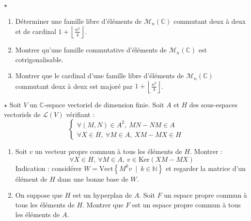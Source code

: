 \documentclass[french,a4paper]{article}
\newcommand{\N}{\mathbb{N}}
\newcommand{\C}{\mathbb{C}}
\renewcommand{\ker}{\text{Ker}}
\theoremstyle{plain}
\theoremstyle{definition}
\theoremstyle{remark}
\begin{document}
\begin{ex}[ENS]{$\star$}
	\begin{enumerate}
		\item Déterminer une famille libre d'éléments de $\mathcal{M}_n(\C)$ commutant deux à deux et de cardinal $1+\displaystyle\left\lfloor\frac{n^2}{4}\right\rfloor$.
		\item Montrer qu'une famille commutative d'éléments de $\mathcal{M}_n(\C)$ est cotrigonalisable.
		\item Montrer que le cardinal d'une famille libre d'éléments de $\mathcal{M}_n(\C)$ commutant deux à deux est majoré par $1+\displaystyle\left\lfloor\frac{n^2}{4}\right\rfloor$.
	\end{enumerate}
\end{ex}

\begin{ex}[ENS]{$\star$}
	Soit $V$ un $\C$-espace vectoriel de dimension finie. Soit $A$ et $H$ des sous-espaces vectoriels de $\mathcal{L}(V)$ vérifiant : $$\begin{cases}
		\forall (M,N)\in A^2,\ MN-NM\in A\\
		\forall X\in H,\ \forall M\in A,\ XM-MX\in H
	\end{cases}$$
	\begin{enumerate}
		\item Soit $v$ un vecteur propre commun à tous les éléments de $H$. Montrer : $$\forall X\in H,\ \forall M\in A,\ v\in\ker(XM-MX)$$
		Indication : considérer $W=\text{Vect}\left\{M^kv\ \mid\ k\in\N\right\}$ et regarder la matrice d'un élément de $H$ dans une bonne base de $W$.
		\item On suppose que $H$ est un hyperplan de $A$. Soit $F$ un espace propre commun à tous les éléments de $H$. Montrer que $F$ est un espace propre commun à tous les éléments de $A$.
	\end{enumerate}
\end{ex}
\end{document}
